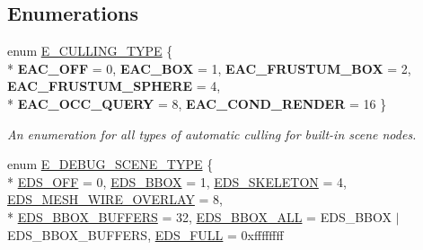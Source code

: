 \subsection*{Enumerations}
\begin{DoxyCompactItemize}
\item 
enum \hyperlink{namespaceirr_1_1scene_acabb2772476aa3706e65a7dc77fd9cce}{E\+\_\+\+C\+U\+L\+L\+I\+N\+G\+\_\+\+T\+Y\+PE} \{ \\*
{\bfseries E\+A\+C\+\_\+\+O\+FF} = 0, 
{\bfseries E\+A\+C\+\_\+\+B\+OX} = 1, 
{\bfseries E\+A\+C\+\_\+\+F\+R\+U\+S\+T\+U\+M\+\_\+\+B\+OX} = 2, 
{\bfseries E\+A\+C\+\_\+\+F\+R\+U\+S\+T\+U\+M\+\_\+\+S\+P\+H\+E\+RE} = 4, 
\\*
{\bfseries E\+A\+C\+\_\+\+O\+C\+C\+\_\+\+Q\+U\+E\+RY} = 8, 
{\bfseries E\+A\+C\+\_\+\+C\+O\+N\+D\+\_\+\+R\+E\+N\+D\+ER} = 16
 \}\hypertarget{namespaceirr_1_1scene_acabb2772476aa3706e65a7dc77fd9cce}{}\label{namespaceirr_1_1scene_acabb2772476aa3706e65a7dc77fd9cce}
\begin{DoxyCompactList}\small\item\em An enumeration for all types of automatic culling for built-\/in scene nodes. \end{DoxyCompactList}
\item 
enum \hyperlink{namespaceirr_1_1scene_a52b664c4c988113735042b168fc32dbe}{E\+\_\+\+D\+E\+B\+U\+G\+\_\+\+S\+C\+E\+N\+E\+\_\+\+T\+Y\+PE} \{ \\*
\hyperlink{namespaceirr_1_1scene_a52b664c4c988113735042b168fc32dbea25111b15f03bee9a99498737286916dc}{E\+D\+S\+\_\+\+O\+FF} = 0, 
\hyperlink{namespaceirr_1_1scene_a52b664c4c988113735042b168fc32dbea19e56bb3d3b18134fa63e0529629b427}{E\+D\+S\+\_\+\+B\+B\+OX} = 1, 
\hyperlink{namespaceirr_1_1scene_a52b664c4c988113735042b168fc32dbeaa7664e189b8641ac54cf27f70f6d8144}{E\+D\+S\+\_\+\+S\+K\+E\+L\+E\+T\+ON} = 4, 
\hyperlink{namespaceirr_1_1scene_a52b664c4c988113735042b168fc32dbea349b086537ac770f09935af4e31d3f3e}{E\+D\+S\+\_\+\+M\+E\+S\+H\+\_\+\+W\+I\+R\+E\+\_\+\+O\+V\+E\+R\+L\+AY} = 8, 
\\*
\hyperlink{namespaceirr_1_1scene_a52b664c4c988113735042b168fc32dbea0179a3df80ac09143dfffed0bd9e99d1}{E\+D\+S\+\_\+\+B\+B\+O\+X\+\_\+\+B\+U\+F\+F\+E\+RS} = 32, 
\hyperlink{namespaceirr_1_1scene_a52b664c4c988113735042b168fc32dbea80f38e42f1b8cf169e83f44092367bfe}{E\+D\+S\+\_\+\+B\+B\+O\+X\+\_\+\+A\+LL} = E\+D\+S\+\_\+\+B\+B\+OX $\vert$ E\+D\+S\+\_\+\+B\+B\+O\+X\+\_\+\+B\+U\+F\+F\+E\+RS, 
\hyperlink{namespaceirr_1_1scene_a52b664c4c988113735042b168fc32dbea24ffe5e6e99d589b3c80181e7c7dd4e2}{E\+D\+S\+\_\+\+F\+U\+LL} = 0xffffffff

\end{DoxyCompactItemize}
